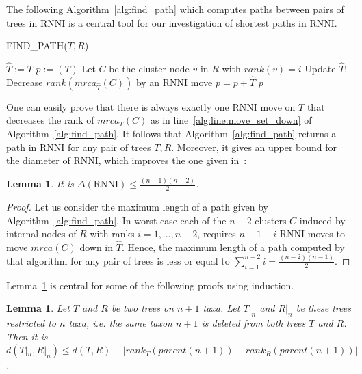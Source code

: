 \documentclass[11pt, a4paper]{article}
\newcommand{\rnni}{\mathrm{RNNI}}
\newtheorem{lemma}[definition]{Lemma}
\begin{document}
The following Algorithm~\ref{alg:find_path} which computes paths between pairs of trees in $\rnni$ is a central tool for our investigation of shortest paths in $\rnni$.

\begin{algorithm}[H]
\caption{FIND\_PATH($T,R$)}
\label{alg:find_path}
\begin{algorithmic}[1]
	\STATE $\hat{T} := T$
	\STATE $p := (T)$
		\STATE Let $C$ be the cluster node $v$ in $R$ with $rank(v) = i$
			\STATE Update $\hat{T}$: Decrease $rank(mrca_{\hat{T}}(C))$ by an $\rnni$ move \label{alg:line:move_set_down}
			\STATE $p = p+\hat{T}$
		\ENDWHILE
	\ENDFOR
	\RETURN $p$
\end{algorithmic}
\end{algorithm}


One can easily prove that there is always exactly one $\rnni$ move on $T$ that decreases the rank of $mrca_T(C)$ as in line~\ref{alg:line:move_set_down} of Algorithm~\ref{alg:find_path}.
It follows that Algorithm~\ref{alg:find_path} returns a path in $\rnni$ for any pair of trees $T,R$.
Moreover, it gives an upper bound for the diameter of $\rnni$, which improves the one given in~\cite{Gavryushkin2017}:

\begin{lemma}
    It is $\Delta(\rnni) \leq \frac{(n-1)(n-2)}{2}$.
\end{lemma}

\begin{proof}
    Let us consider the maximum length of a path given by Algorithm~\ref{alg:find_path}.
    In worst case each of the $n-2$ clusters $C$ induced by internal nodes of $R$ with ranks $i = 1, \dots, n-2$, requires $n-1-i$ $\rnni$ moves to move $mrca(C)$ down in $\hat{T}$.
	Hence, the maximum length of a path computed by that algorithm for any pair of trees is less or equal to $\sum\limits_{i = 1}^{n-2} i = \frac{(n-2)(n-1)}{2}$.
\end{proof}

Lemma~\ref{lemma:distance_delete_taxon} is central for some of the following proofs using induction.

\begin{lemma}
    Let $T$ and $R$ be two trees on $n+1$ taxa.
    Let $T|_n$ and $R|_n$ be these trees restricted to $n$ taxa, i.e. the same taxon $n+1$ is deleted from both trees $T$ and $R$.
    Then it is $d(T|_n, R|_n) \leq d(T,R) - |rank_T(parent(n+1)) - rank_R(parent(n+1))|$.
    \label{lemma:distance_delete_taxon}
\end{lemma}
\end{document}
